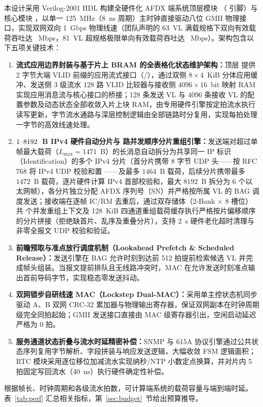 本设计采用 Verilog-2001 HDL 构建全硬件化 AFDX 端系统顶层模块 （\Pins{} 引脚）与核心模块 ，以单一 125~MHz（8~ns 周期）主时钟直接驱动八位 GMII 物理接口，实现双网双向 1~Gbps 物理线速（团队声明的 63~VL 满载规格下双向有效载荷吞吐达 \ThruSixtyThreeBi~Mbps，81~VL 超规格极限单向有效载荷吞吐达 \ThruEightyOne~Mbps）。架构包含以下五项关键技术：
\begin{enumerate}
  \item \textbf{流式应用边界封装与基于片上 BRAM 的全表格化状态维护架构：}顶层  提供 2 字节大端 VLID 前缀的应用流式接口（/），通过双侧 $8\times 4$~KiB 分体应用缓冲、发送侧 3 级流水 128 路 VLID 比较器与接收侧 $4096\times 16$~bit 映射 RAM 实现应用消息流与核心接口的桥接；128 条发送 VL 与 4096 条接收 VL 的配置参数及动态状态全部收敛入片上块 RAM，由专用硬件引擎按定拍流水执行读写更新，字节流水通路与深层控制逻辑由全部链路时分复用，实现每拍处理一字节的高效线速处理。
  \item \textbf{$1\text{--}8192$~B IPv4 硬件自动分片与 \ReasmContexts{} 路并发顺序分片重组引擎：}发送端对超过单帧最大载荷（$L_\text{max}=1471$~B）的长消息自动拆分为共享同一 IP 标识（Identification）的多个 IPv4 分片（首分片携带 8 字节 UDP 头——按 RFC 768 将 IPv4 UDP 校验和置 ——及最多 $1464$~B 载荷，后续分片携带最多 $1472$~B 载荷，逐片硬件计算 IPv4 首部校验和，最大 $8192$~B 拆分为 6 个以太网帧），各分片独立分配 AFDX 序列号（SN）并严格按所属 VL 的 BAG 调度发送；接收端在逐帧 IC/RM 去重后，通过双存储体（2-Bank $\times$ 8 槽位）共 \ReasmContexts{} 个并发重组上下文及 128~KiB 四通道重组载荷缓存执行严格按片偏移顺序的分片拼接（拒绝缺首片、乱序及重叠分片），支持 2~s 硬件老化超时清理与非零全报文 UDP 校验和验证。
  \item \textbf{前瞻预取与准点放行调度机制（Lookahead Prefetch \& Scheduled Release）：}发送引擎在 BAG 允许时刻到达前 512 拍提前检索候选 VL 并完成帧头组装。当报文提前排队且无线路冲突时，MAC 在允许发送时刻准点输出首前导码字节，实现稳态零发送抖动。
  \item \textbf{双网锁步自研线速 MAC（Lockstep Dual-MAC）：}采用单主控状态机同步驱动 A、B 双网 CRC-32 累加器与物理输出寄存器，保证双网副本在时钟周期级完全同拍起始；GMII 发送接口直接由 MAC 级寄存器引出，空闲启动延迟严格为 0 拍。
  \item \textbf{服务通道状态折叠与流水时延精密补偿：}SNMP 与 615A 协议引擎通过公共状态序列复用字节解析、字段拼装与响应发送逻辑，大幅收敛 FSM 逻辑面积；RTC 模块采用逐位移位加减流水实现纳秒/NTP 小数定点换算，并对片内 5 拍固定写回流水（40~ns）执行硬件确定性补偿。
\end{enumerate}
根据帧长、时钟周期和各级流水拍数，可计算端系统的载荷容量与端到端时延。表~\ref{tab:perf} 汇总相关指标，第~\ref{sec:budget}~节给出预算推导。

